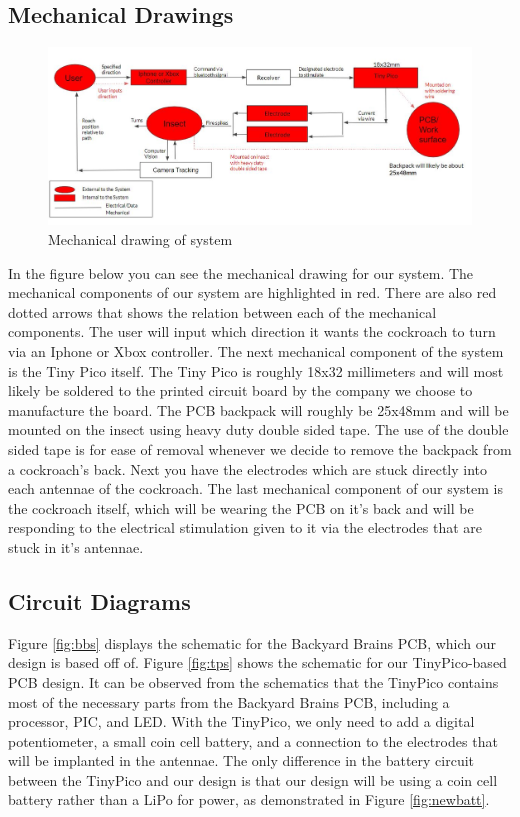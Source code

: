 \documentclass{article}
\begin{document}
\subsection{Mechanical Drawings}
\begin{figure}[ht!]
\centering
\includegraphics[scale=0.60]{mech.JPG}
\caption{Mechanical drawing of system}
\label{fig:mech}
\end{figure}

\bigskip

\par In the figure below you can see the mechanical drawing for our system. The mechanical components of our system are highlighted in red. There are also red dotted arrows that shows the relation between each of the mechanical components. The user will input which direction it wants the cockroach to turn via an Iphone or Xbox controller. The next mechanical component of the system is the Tiny Pico itself. The Tiny Pico is roughly 18x32 millimeters and will most likely be soldered to the printed circuit board by the company we choose to manufacture the board. The PCB backpack will roughly be 25x48mm and will be mounted on the insect using heavy duty double sided tape. The use of the double sided tape is for ease of removal whenever we decide to remove the backpack from a cockroach's back. Next you have the electrodes which are stuck directly into each antennae of the cockroach. The last mechanical component of our system is the cockroach itself, which will be wearing the PCB on it's back and will be responding to the electrical stimulation given to it via the electrodes that are stuck in it's antennae. 

\subsection{Circuit Diagrams}
\par Figure \ref{fig:bbs} displays the schematic for the Backyard Brains PCB, which our design is based off of. Figure \ref{fig:tps} shows the schematic for our TinyPico-based PCB design. It can be observed from the schematics that the TinyPico contains most of the necessary parts from the Backyard Brains PCB, including a processor, PIC, and LED. With the TinyPico, we only need to add a digital potentiometer, a small coin cell battery, and a connection to the electrodes that will be implanted in the antennae. The only difference in the battery circuit between the TinyPico and our design is that our design will be using a coin cell battery rather than a LiPo for power, as demonstrated in Figure \ref{fig:newbatt}.
\end{document}
